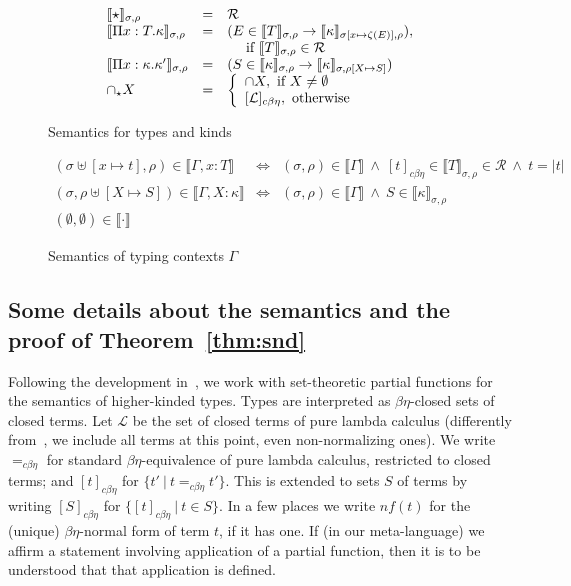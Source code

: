 \documentclass{article}
\newcommand{\choice}[0]{\zeta}
\newcommand{\elcap}[0]{\cap}
\newcommand{\interp}[1]{\llbracket #1 \rrbracket}
\newcommand{\cbe}[0]{c\beta\eta}
\begin{document}
\begin{figure}
\[\begin{array}{lll}
\interp{\star}_{\sigma,\rho} & = & \mathcal{R} \\ 
\interp{\Pi x:T.\kappa}_{\sigma,\rho} & = & 
(E\in\interp{T}_{\sigma,\rho} \to \interp{\kappa}_{\sigma[x\mapsto \choice(E)],\rho}),\\
\ &\ &\ \ \ \textnormal{ if }\interp{T}_{\sigma,\rho}\in\mathcal{R} \\
\interp{\Pi x:\kappa.\kappa'}_{\sigma,\rho} & = & (S\in\interp{\kappa}_{\sigma,\rho} \to \interp{\kappa}_{\sigma,\rho[X\mapsto S]}) \\
\elcap_\star X & = & \left\{\begin{array}{l}
                                         \, \negthinspace\elcap X, \textnormal{ if } X\neq\emptyset\\
                                         \, \negthinspace[\mathcal{L}]_{\cbe},\textnormal{ otherwise}
                                       \end{array}\right. \\
\end{array}
\]
\caption{Semantics for types and kinds}
\label{fig:semtp}
\end{figure}

\begin{figure}
\[
\begin{array}{lll}
(\sigma\uplus[x\mapsto t],\rho)\in\interp{\Gamma,x:T} & \Leftrightarrow & (\sigma,\rho)\in\interp{\Gamma} \ \wedge\ 
 [t]_{\cbe}\in\interp{T}_{\sigma,\rho}\in\mathcal{R}\ \wedge\ t = |t| \\
(\sigma,\rho\uplus[X\mapsto S])\in\interp{\Gamma,X:\kappa} & \Leftrightarrow & (\sigma,\rho)\in\interp{\Gamma} \ \wedge\ 
S\in\interp{\kappa}_{\sigma,\rho} \\
(\emptyset,\emptyset)\in\interp{\cdot}
\end{array}
\]
\caption{Semantics of typing contexts $\Gamma$}
\label{fig:semctxt}
\end{figure}

\subsection{Some details about the semantics and the proof of Theorem~\ref{thm:snd}}
\label{sec:snd}

Following the development in~\cite{stump17}, we work with
set-theoretic partial functions for the semantics of higher-kinded
types.  Types are interpreted as $\beta\eta$-closed sets of closed
terms. Let $\mathcal{L}$ be the set of closed terms of pure lambda calculus
(differently from~\cite{stump17}, we include all terms at this point,
even non-normalizing ones).  We
write $=_{\cbe}$ for standard $\beta\eta$-equivalence of pure lambda calculus, restricted to
closed terms; and $[t]_{\cbe}$ for $\{ t'\ |\ t =_{\cbe} t'\}$.  This
is extended to sets $S$ of terms by writing $[S]_{\cbe}$ for
$\{[t]_{\cbe}\ |\ t\in S\}$.  In a few places we write
$\textit{nf}(t)$ for the (unique) $\beta\eta$-normal form of term $t$,
if it has one.  If (in our meta-language) we affirm a statement
involving application of a partial function, then it is to be
understood that that application is defined.
\end{document}
